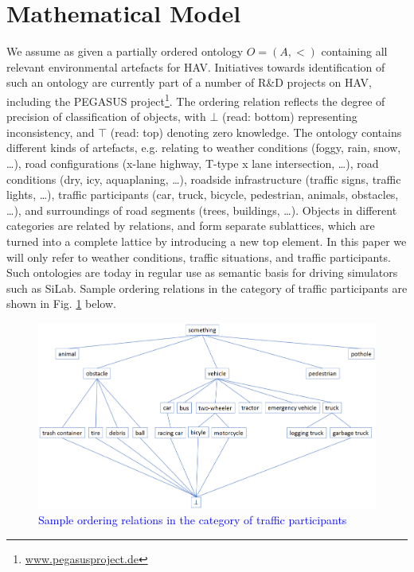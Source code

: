 \section{Mathematical Model}\label{sec:mathmodel}
We assume as given a partially ordered ontology $O = (A, <)$ containing all relevant environmental artefacts for HAV. Initiatives towards identification of such an ontology are currently part of a number of R\&D projects on HAV, including the PEGASUS project\footnote{\url{www.pegasusproject.de}}. The ordering relation reflects the degree of precision of classification of objects, with $\bot$ (read: bottom) representing inconsistency, and $\top$ (read: top) denoting zero knowledge. The ontology contains different kinds of artefacts, e.g. relating to weather conditions (foggy, rain, snow, \ldots), road configurations (x-lane highway, T-type x lane intersection, \ldots), road conditions (dry, icy, aquaplaning, \ldots), roadside infrastructure (traffic signs, traffic lights, \ldots), traffic participants (car, truck, bicycle, pedestrian, animals, obstacles, \ldots), and surroundings of road segments (trees, buildings, \ldots). Objects in different categories are related by relations, and form separate sublattices, which are turned into a complete lattice by introducing a new top element. In this paper we will only refer to weather conditions, traffic situations, and traffic participants. Such ontologies are today in regular use as semantic basis for driving simulators such as SiLab. Sample ordering relations in the category of traffic participants are shown in Fig. \ref{fig1} below.
\begin{figure}
\includegraphics[width=\textwidth]{fig1.eps}
\caption{\textcolor{blue}{Sample ordering relations in the category of traffic participants}} \label{fig1}
\end{figure}

